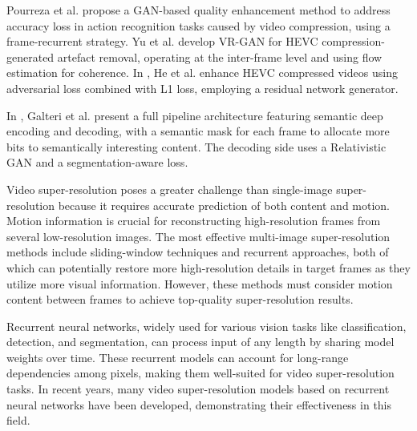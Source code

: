 Pourreza et al. \cite{pourreza2019recognizing} propose a GAN-based quality enhancement method to address accuracy loss in action recognition tasks caused by video compression, using a frame-recurrent strategy. Yu et al. develop VR-GAN \cite{yu2019hevc} for HEVC compression-generated artefact removal, operating at the inter-frame level and using flow estimation for coherence. In \cite{wang2020visual}, He et al. enhance HEVC compressed videos using adversarial loss combined with L1 loss, employing a residual network generator.

In \cite{galteri2020increasing}, Galteri et al. present a full pipeline architecture featuring semantic deep encoding and decoding, with a semantic mask for each frame to allocate more bits to semantically interesting content. The decoding side uses a Relativistic GAN and a segmentation-aware loss.

Video super-resolution poses a greater challenge than single-image super-resolution because it requires accurate prediction of both content and motion. Motion information is crucial for reconstructing high-resolution frames from several low-resolution images. The most effective multi-image super-resolution methods include sliding-window techniques and recurrent approaches, both of which can potentially restore more high-resolution details in target frames as they utilize more visual information. However, these methods must consider motion content between frames to achieve top-quality super-resolution results.

Recurrent neural networks, widely used for various vision tasks like classification, detection, and segmentation, can process input of any length by sharing model weights over time. These recurrent models can account for long-range dependencies among pixels, making them well-suited for video super-resolution tasks. In recent years, many video super-resolution models based on recurrent neural networks have been developed, demonstrating their effectiveness in this field.

